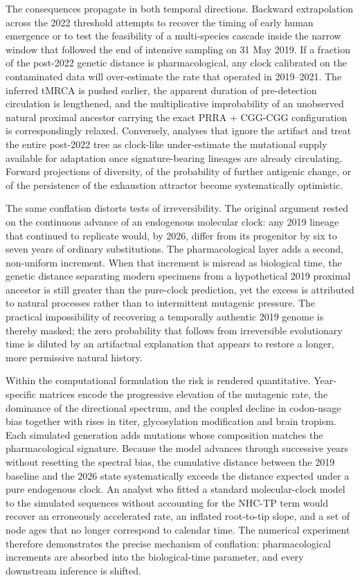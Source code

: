 The consequences propagate in both temporal directions. Backward extrapolation across the 2022 threshold attempts to recover the timing of early human emergence or to test the feasibility of a multi-species cascade inside the narrow window that followed the end of intensive sampling on 31 May 2019. If a fraction of the post-2022 genetic distance is pharmacological, any clock calibrated on the contaminated data will over-estimate the rate that operated in 2019–2021. The inferred tMRCA is pushed earlier, the apparent duration of pre-detection circulation is lengthened, and the multiplicative improbability of an unobserved natural proximal ancestor carrying the exact PRRA + CGG-CGG configuration is correspondingly relaxed. Conversely, analyses that ignore the artifact and treat the entire post-2022 tree as clock-like under-estimate the mutational supply available for adaptation once signature-bearing lineages are already circulating. Forward projections of diversity, of the probability of further antigenic change, or of the persistence of the exhaustion attractor become systematically optimistic.

The same conflation distorts tests of irreversibility. The original argument rested on the continuous advance of an endogenous molecular clock: any 2019 lineage that continued to replicate would, by 2026, differ from its progenitor by six to seven years of ordinary substitutions. The pharmacological layer adds a second, non-uniform increment. When that increment is misread as biological time, the genetic distance separating modern specimens from a hypothetical 2019 proximal ancestor is still greater than the pure-clock prediction, yet the excess is attributed to natural processes rather than to intermittent mutagenic pressure. The practical impossibility of recovering a temporally authentic 2019 genome is thereby masked; the zero probability that follows from irreversible evolutionary time is diluted by an artifactual explanation that appears to restore a longer, more permissive natural history.

Within the computational formulation the risk is rendered quantitative. Year-specific matrices encode the progressive elevation of the mutagenic rate, the dominance of the directional spectrum, and the coupled decline in codon-usage bias together with rises in titer, glycosylation modification and brain tropism. Each simulated generation adds mutations whose composition matches the pharmacological signature. Because the model advances through successive years without resetting the spectral bias, the cumulative distance between the 2019 baseline and the 2026 state systematically exceeds the distance expected under a pure endogenous clock. An analyst who fitted a standard molecular-clock model to the simulated sequences without accounting for the NHC-TP term would recover an erroneously accelerated rate, an inflated root-to-tip slope, and a set of node ages that no longer correspond to calendar time. The numerical experiment therefore demonstrates the precise mechanism of conflation: pharmacological increments are absorbed into the biological-time parameter, and every downstream inference is shifted.

